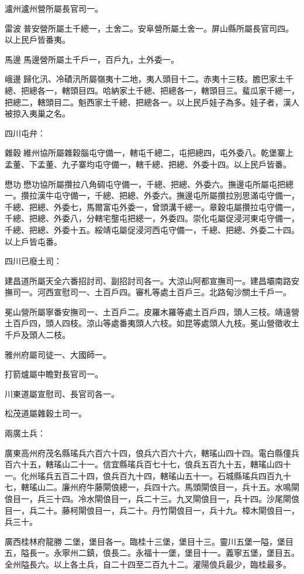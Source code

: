 \begin{pinyinscope}
瀘州瀘州營所屬長官司一。

雷波普安營所屬土千總一，土舍二。安阜營所屬土舍一。屏山縣所屬長官司四。以上民戶皆番夷。

馬邊馬邊營所屬土千戶一，百戶九，土外委一。

峨邊歸化汛、冷磧汛所屬嶺夷十二地，夷人頭目十二。赤夷十三枝。膽巴家土千總、把總各一，轄頭目四。哈納家土千總、把總各一，轄頭目三。蜚瓜家千總一，把總二，轄頭目二。魁西家土千總、把總各一。以上民戶娃子為多。娃子者，漢人被掠入夷巢之名。

四川屯弁：

雜穀維州協所屬雜穀腦屯守備一，轄屯千總二，屯把總四，屯外委八。乾堡寨上孟董、下孟董、九子寨均屯守備一，轄千總、把總、外委十四。以上民戶皆番。

懋功懋功協所屬攢拉八角碉屯守備一，千總、把總、外委六。撫邊屯所屬屯把總一。攢拉漢牛屯守備一，千總、把總、外委六。撫邊屯所屬攢拉別思滿屯守備一，千總、把總、外委七，馬爾富屯外委一，曾頭溝千總一。章穀屯屬攢拉屯守備一，千總、把總、外委八，分轄宅壟屯把總一，外委四。崇化屯屬促浸河東屯守備一，千總、把總、外委十五。綏靖屯屬促浸河西屯守備一，千總、把總、外委二十四。以上戶皆屯番。

四川已廢土司：

建昌道所屬天全六番招討司、副招討司各一。大涼山阿都宣撫司一。建昌壩南路安撫司一。河西宣慰司一、土百戶四。審札等處土百戶三。北路甸沙關土千戶一。

冕山營所屬寧番安撫司一、土百戶二。皮羅木羅等處土百戶四，頭人三枝。靖遠營土百戶四，頭人四枝。涼山等處番夷頭人六枝。如昆等處頭人九枝。冕山營徵收土千戶及頭人二枝。

雅州府屬司徒一、大國師一。

打箭爐屬中瞻對長官司一。

川東道屬宣慰司、長官司各一。

松茂道屬雜穀土司一。

兩廣土兵：

廣東高州府茂名縣瑤兵六百六十四，俍兵六百六十六，轄瑤山四十四。電白縣僮兵百六十五，轄瑤山二十一。信宜縣瑤兵百七十七，俍兵五百九十五，轄瑤山四十一。化州瑤兵五百二十四，俍兵百九十四，轄瑤山五十一。石城縣瑤兵四百九十七，轄瑤山二。廉州府牛藤閘俍總一，兵四十六。馬頭閘俍目一，兵十五。水鳴閘俍目一，兵三十四。冷水閘俍目一，兵二十三。九叉閘俍目一，兵十四。沙尾閘俍目一，兵二十。藤柯閘俍目一，兵二十。丹竹閘俍目一，兵十九。樟木閘俍目一，兵三十。

廣西桂林府龍勝二堡，堡目各一。臨桂十三堡，堡目十三。靈川五堡一隘，堡目五，隘長一。永寧州二鎮，俍長二。永福十一堡，堡目十一。義寧五堡，堡目五。全州隘長六。以上各土兵，自二十四至二百九十二。灌陽俍兵最少，臨桂最多。


\end{pinyinscope}
